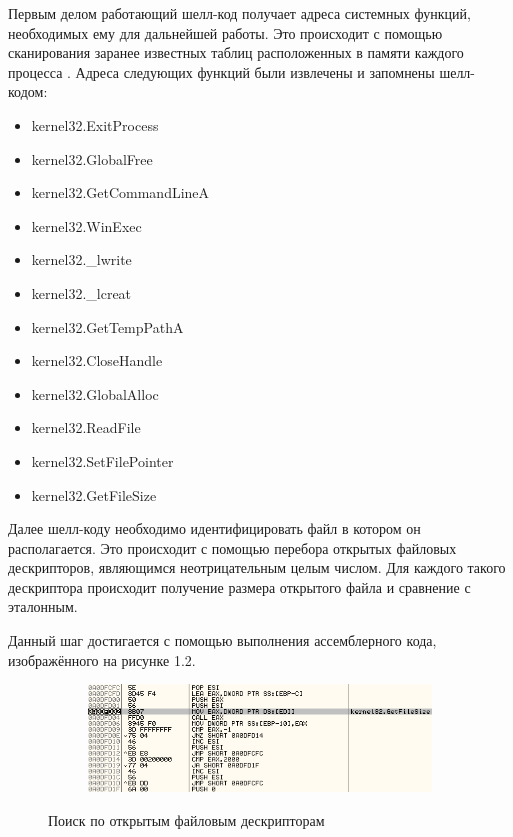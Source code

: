 Первым делом работающий шелл-код получает адреса системных функций, необходимых ему для дальнейшей работы.
Это происходит с помощью сканирования заранее известных таблиц расположенных в памяти каждого процесса \cite{peb_ldr}\cite{peb_ldr_example}.
Адреса следующих функций были извлечены и запомнены шелл-кодом:
\begin{itemize}
\item kernel32.ExitProcess
\item kernel32.GlobalFree
\item kernel32.GetCommandLineA
\item kernel32.WinExec
\item kernel32.\_lwrite
\item kernel32.\_lcreat
\item kernel32.GetTempPathA
\item kernel32.CloseHandle
\item kernel32.GlobalAlloc
\item kernel32.ReadFile
\item kernel32.SetFilePointer
\item kernel32.GetFileSize
\end{itemize}

Далее шелл-коду необходимо идентифицировать файл в котором он располагается.
Это происходит с помощью перебора открытых файловых дескрипторов, являющимся неотрицательным целым числом.
Для каждого такого дескриптора происходит получение размера открытого файла и сравнение с эталонным.

\newpage
Данный шаг достигается с помощью выполнения ассемблерного кода, изображённого на рисунке 1.2. 

\begin{figure}[ht]
	\centering
    \begin{subfigure}[b]{1\textwidth}
    \centering
        \includegraphics[scale=0.8]{1.pdf/pasted-image-19.png}
    \end{subfigure}
 
    \caption{Поиск по открытым файловым дескрипторам}
    \label{fig_parsetree}
\end{figure}

